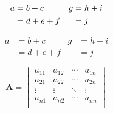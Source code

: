 \documentclass{article}
\begin{document}
\begin{align}
a &= b + c  &     g &= h + i \\
  &= d + e + f  &   &= j\notag
\end{align}

\begin{equation}
\begin{aligned}
a &= b + c  &     g &= h + i \\
  &= d + e + f  &   &= j
\end{aligned}
\end{equation}

\[
\mathbf{A} = \begin{vmatrix}
a_{11} & a_{12} & \cdots & a_{1n}\\
a_{21} & a_{22} & \cdots & a_{2n}\\
\vdots & \vdots & \ddots & \vdots\\
a_{n1} & a_{n2} & \cdots & a_{nn}\\
\end{vmatrix}
\]
\end{document}
